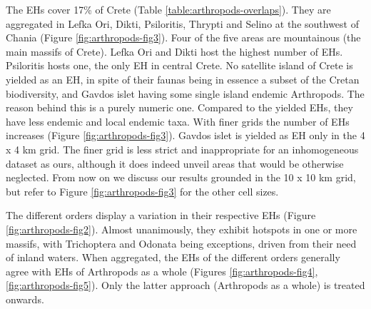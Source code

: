     The EHs cover 17\% of Crete (Table \ref{table:arthropods-overlaps}). They are aggregated in Lefka Ori, Dikti,
Psiloritis, Thrypti and Selino at the southwest of Chania (Figure \ref{fig:arthropods-fig3}).
Four of the five areas are mountainous (the main massifs of Crete). Lefka Ori
and Dikti host the highest number of EHs. Psiloritis hosts one, the only EH in
central Crete. No satellite island of Crete is yielded as an EH, in spite of
their faunas being in essence a subset of the Cretan biodiversity, and Gavdos
islet having some single island endemic Arthropods. The reason behind this is a
purely numeric one. Compared to the yielded EHs, they have less endemic and local
endemic taxa. With finer grids the number of EHs increases (Figure \ref{fig:arthropods-fig3}).
Gavdos islet is yielded as EH only in the 4 x 4 km grid. The finer grid is less strict
and inappropriate for an inhomogeneous dataset as ours, although it does indeed
unveil areas that would be otherwise neglected. From now on we discuss our
results grounded in the 10 x 10 km grid, but refer to Figure \ref{fig:arthropods-fig3} for the other
cell sizes.

The different orders display a variation in their respective EHs (Figure \ref{fig:arthropods-fig2}).
Almost unanimously, they exhibit hotspots in one or more massifs,
with Trichoptera and Odonata being exceptions, driven from their need of inland waters.
When aggregated, the EHs of the different orders generally agree with EHs of
Arthropods as a whole (Figures \ref{fig:arthropods-fig4}, \ref{fig:arthropods-fig5}). Only the
latter approach (Arthropods as a whole) is treated onwards.

